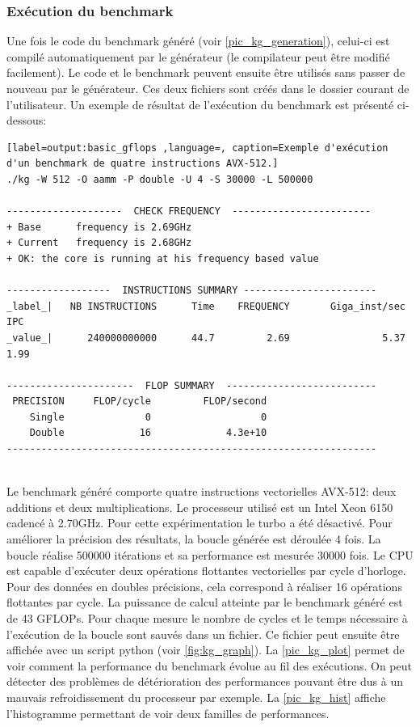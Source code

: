     \subsubsection{Exécution du benchmark}

        Une fois le code du benchmark généré (voir \autoref{pic_kg_generation}), celui-ci est compilé automatiquement par le générateur (le compilateur peut être modifié facilement). Le code et le benchmark peuvent ensuite être utilisés  sans passer de nouveau par le générateur. Ces deux fichiers sont créés dans le dossier courant de l'utilisateur. Un exemple de résultat de l'exécution du benchmark est présenté ci-dessous:
    
    
 \begin{lstlisting}[label=output:basic_gflops ,language=, caption=Exemple d'exécution d'un benchmark de quatre instructions AVX-512.]
./kg -W 512 -O aamm -P double -U 4 -S 30000 -L 500000

--------------------  CHECK FREQUENCY  ------------------------
+ Base      frequency is 2.69GHz
+ Current   frequency is 2.68GHz
+ OK: the core is running at his frequency based value

------------------  INSTRUCTIONS SUMMARY -----------------------
_label_|   NB INSTRUCTIONS      Time    FREQUENCY       Giga_inst/sec       IPC
_value_|      240000000000      44.7         2.69                5.37      1.99

----------------------  FLOP SUMMARY  --------------------------
 PRECISION     FLOP/cycle         FLOP/second
    Single              0                   0
    Double             16             4.3e+10
----------------------------------------------------------------


\end{lstlisting}   
    
        Le benchmark généré comporte quatre instructions vectorielles AVX-512: deux additions et deux multiplications. Le processeur utilisé est un  Intel Xeon 6150 cadencé à 2.70GHz. Pour cette expérimentation le turbo a été désactivé. Pour améliorer la précision des résultats, la boucle générée est déroulée 4 fois. La boucle réalise 500000 itérations et sa performance est mesurée 30000 fois. Le CPU est capable d'exécuter deux opérations flottantes vectorielles par cycle d'horloge. Pour des données en doubles précisions, cela correspond à réaliser 16 opérations flottantes par cycle. La puissance de calcul atteinte par le benchmark généré est de 43 GFLOPs. Pour chaque mesure le nombre de cycles et le temps nécessaire à l'exécution de la boucle sont sauvés dans un fichier. Ce fichier peut ensuite être affichée avec un script python (voir \autoref{fig:kg_graph}). La \autoref{pic_kg_plot} permet de voir comment la performance du benchmark évolue au fil des exécutions. On peut détecter des problèmes de détérioration des performances pouvant être dus à un mauvais refroidissement du processeur par exemple.  La \autoref{pic_kg_hist} affiche l'histogramme permettant de voir deux familles de performances.
        
